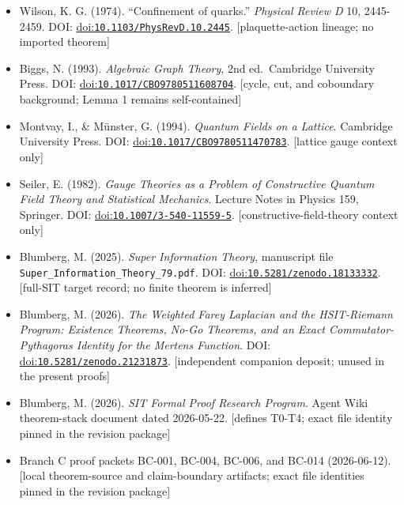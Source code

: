\documentclass[
  american,
  11pt,
  letterpaper,
]{article}
\providecommand{\tightlist}{%
  \setlength{\itemsep}{0pt}\setlength{\parskip}{0pt}}
\begin{document}
\begin{itemize}
\tightlist
\item
  Wilson, K. G. (1974). ``Confinement of quarks.'' \emph{Physical Review D} 10, 2445-2459. DOI: \href{https://doi.org/10.1103/PhysRevD.10.2445}{doi:\nolinkurl{10.1103/PhysRevD.10.2445}}. {[}plaquette-action lineage; no imported theorem{]}
\item
  Biggs, N. (1993). \emph{Algebraic Graph Theory}, 2nd ed.~Cambridge University Press. DOI: \href{https://doi.org/10.1017/CBO9780511608704}{doi:\nolinkurl{10.1017/CBO9780511608704}}. {[}cycle, cut, and coboundary background; Lemma 1 remains self-contained{]}
\item
  Montvay, I., \& Münster, G. (1994). \emph{Quantum Fields on a Lattice}. Cambridge University Press. DOI: \href{https://doi.org/10.1017/CBO9780511470783}{doi:\nolinkurl{10.1017/CBO9780511470783}}. {[}lattice gauge context only{]}
\item
  Seiler, E. (1982). \emph{Gauge Theories as a Problem of Constructive Quantum Field Theory and Statistical Mechanics}. Lecture Notes in Physics 159, Springer. DOI: \href{https://doi.org/10.1007/3-540-11559-5}{doi:\nolinkurl{10.1007/3-540-11559-5}}. {[}constructive-field-theory context only{]}
\item
  Blumberg, M. (2025). \emph{Super Information Theory}, manuscript file \nolinkurl{Super_Information_Theory_79.pdf}. DOI: \href{https://doi.org/10.5281/zenodo.18133332}{doi:\nolinkurl{10.5281/zenodo.18133332}}. {[}full-SIT target record; no finite theorem is inferred{]}
\item
  Blumberg, M. (2026). \emph{The Weighted Farey Laplacian and the HSIT-Riemann Program: Existence Theorems, No-Go Theorems, and an Exact Commutator-Pythagoras Identity for the Mertens Function}. DOI: \href{https://doi.org/10.5281/zenodo.21231873}{doi:\nolinkurl{10.5281/zenodo.21231873}}. {[}independent companion deposit; unused in the present proofs{]}
\item
  Blumberg, M. (2026). \emph{SIT Formal Proof Research Program}. Agent Wiki theorem-stack document dated 2026-05-22. {[}defines T0-T4; exact file identity pinned in the revision package{]}
\item
  Branch C proof packets BC-001, BC-004, BC-006, and BC-014 (2026-06-12). {[}local theorem-source and claim-boundary artifacts; exact file identities pinned in the revision package{]}
\end{itemize}
\end{document}
